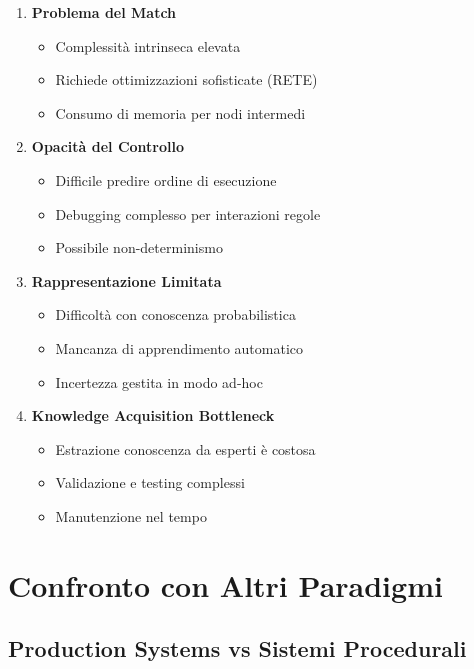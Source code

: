\begin{enumerate}
\item \textbf{Problema del Match}
\begin{itemize}
\item Complessità intrinseca elevata
\item Richiede ottimizzazioni sofisticate (RETE)
\item Consumo di memoria per nodi intermedi
\end{itemize}

\item \textbf{Opacità del Controllo}
\begin{itemize}
\item Difficile predire ordine di esecuzione
\item Debugging complesso per interazioni regole
\item Possibile non-determinismo
\end{itemize}

\item \textbf{Rappresentazione Limitata}
\begin{itemize}
\item Difficoltà con conoscenza probabilistica
\item Mancanza di apprendimento automatico
\item Incertezza gestita in modo ad-hoc
\end{itemize}

\item \textbf{Knowledge Acquisition Bottleneck}
\begin{itemize}
\item Estrazione conoscenza da esperti è costosa
\item Validazione e testing complessi
\item Manutenzione nel tempo
\end{itemize}
\end{enumerate}

\section{Confronto con Altri Paradigmi}

\subsection{Production Systems vs Sistemi Procedurali}

